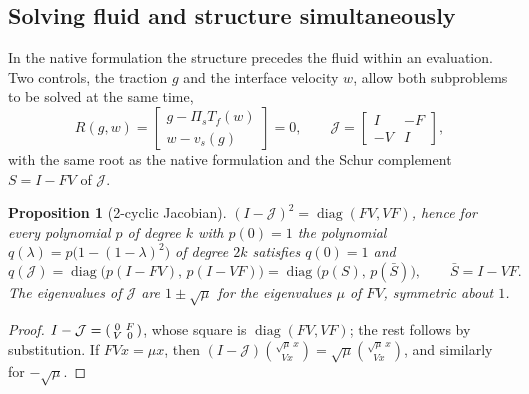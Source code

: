 \documentclass[11pt,a4paper]{article}
\newtheorem{proposition}{Proposition}[section]
\theoremstyle{definition}
\theoremstyle{remark}
\newcommand{\Pis}{\Pi_{s}}
\begin{document}
\subsection{Solving fluid and structure simultaneously}\label{sec:two_cyclic}

In the native formulation the structure precedes the fluid within an evaluation. Two controls, the
traction $g$ and the interface velocity $w$, allow both subproblems to be solved at the same time,
\begin{equation}\label{eq:two_control}
  R(g,w)=\begin{bmatrix}g-\Pis T_f(w)\\ w-v_s(g)\end{bmatrix}=0,\qquad
  \mathcal J=\begin{bmatrix}I&-F\\-V&I\end{bmatrix},
\end{equation}
with the same root as the native formulation and the Schur complement $S=I-FV$ of $\mathcal J$.

\begin{proposition}[2-cyclic Jacobian]\label{prop:two_cyclic}
$(I-\mathcal J)^2=\operatorname{diag}(FV,VF)$, hence for every polynomial $p$ of degree $k$ with
$p(0)=1$ the polynomial $q(\lambda)=p\big(1-(1-\lambda)^2\big)$ of degree $2k$ satisfies $q(0)=1$ and
\begin{equation}\label{eq:two_cyclic}
  q(\mathcal J)=\operatorname{diag}\big(p(I-FV),\,p(I-VF)\big)=\operatorname{diag}\big(p(S),\,p(\bar S)\big),
  \qquad \bar S=I-VF .
\end{equation}
The eigenvalues of $\mathcal J$ are $1\pm\sqrt\mu$ for the eigenvalues $\mu$ of $FV$, symmetric about
$1$.
\end{proposition}
\begin{proof}
$I-\mathcal J=\begin{psmallmatrix}0&F\\V&0\end{psmallmatrix}$, whose square is
$\operatorname{diag}(FV,VF)$; the rest follows by substitution. If $FVx=\mu x$, then
$(I-\mathcal J)\binom{\sqrt\mu\,x}{Vx}=\sqrt\mu\binom{\sqrt\mu\,x}{Vx}$, and similarly for $-\sqrt\mu$.
\end{proof}
\end{document}
